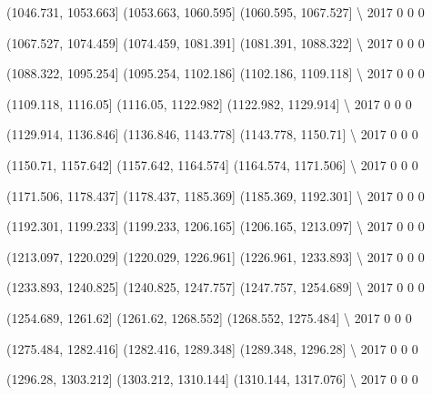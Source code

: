 \documentclass[11pt]{article}
\begin{document}
      (1046.731, 1053.663]  (1053.663, 1060.595]  (1060.595, 1067.527]  \textbackslash{}
2017                     0                     0                     0   

      (1067.527, 1074.459]  (1074.459, 1081.391]  (1081.391, 1088.322]  \textbackslash{}
2017                     0                     0                     0   

      (1088.322, 1095.254]  (1095.254, 1102.186]  (1102.186, 1109.118]  \textbackslash{}
2017                     0                     0                     0   

      (1109.118, 1116.05]  (1116.05, 1122.982]  (1122.982, 1129.914]  \textbackslash{}
2017                    0                    0                     0   

      (1129.914, 1136.846]  (1136.846, 1143.778]  (1143.778, 1150.71]  \textbackslash{}
2017                     0                     0                    0   

      (1150.71, 1157.642]  (1157.642, 1164.574]  (1164.574, 1171.506]  \textbackslash{}
2017                    0                     0                     0   

      (1171.506, 1178.437]  (1178.437, 1185.369]  (1185.369, 1192.301]  \textbackslash{}
2017                     0                     0                     0   

      (1192.301, 1199.233]  (1199.233, 1206.165]  (1206.165, 1213.097]  \textbackslash{}
2017                     0                     0                     0   

      (1213.097, 1220.029]  (1220.029, 1226.961]  (1226.961, 1233.893]  \textbackslash{}
2017                     0                     0                     0   

      (1233.893, 1240.825]  (1240.825, 1247.757]  (1247.757, 1254.689]  \textbackslash{}
2017                     0                     0                     0   

      (1254.689, 1261.62]  (1261.62, 1268.552]  (1268.552, 1275.484]  \textbackslash{}
2017                    0                    0                     0   

      (1275.484, 1282.416]  (1282.416, 1289.348]  (1289.348, 1296.28]  \textbackslash{}
2017                     0                     0                    0   

      (1296.28, 1303.212]  (1303.212, 1310.144]  (1310.144, 1317.076]  \textbackslash{}
2017                    0                     0                     0   
\end{document}
